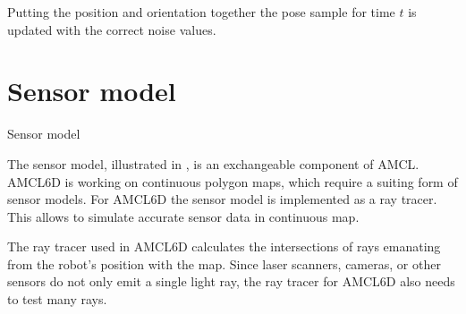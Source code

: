 \documentclass[Thesis.tex]{subfiles}
\begin{document}
Putting the position and orientation together the pose sample for time $t$ is updated with the correct noise values.
%
%
%
%
%
%
\section{Sensor model}\label{sec:sensormodel}
%
\begin{algorithm}[!htp]
\caption{Sensor model}
\label{alg:sensormodel}

\end{algorithm}
%
The sensor model, illustrated in , is an exchangeable component of \gls{AMCL}. \gls{AMCL6D} is working on continuous polygon maps, which require a suiting form of sensor models. For \gls{AMCL6D} the sensor model is implemented as a ray tracer. This allows to simulate accurate sensor data in continuous map. 

\label{sec:raytrace}
The ray tracer used in \gls{AMCL6D} calculates the intersections of rays emanating from the robot's position with the map. Since laser scanners, cameras, or other sensors do not only emit a single light ray, the ray tracer for \gls{AMCL6D} also needs to test many rays. 
\end{document}
